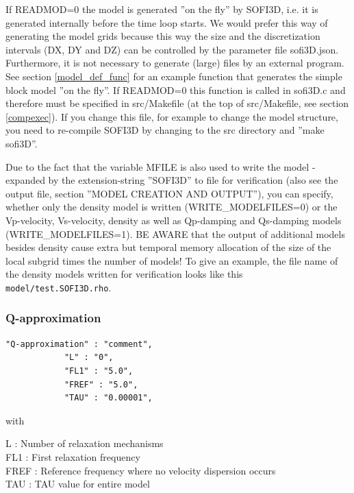 \documentclass[11pt,onecolumn,oneside]{article}
\begin{document}
If READMOD=0 the model is generated ''on the fly'' by SOFI3D, i.e. it is generated internally before the time loop starts. We would prefer this way of generating the model grids because this way the size and the discretization intervals (DX, DY and DZ) can be controlled by the parameter file sofi3D.json. Furthermore, it is not necessary to generate (large) files by an external program. See section \ref{model_def_func} for an example function that generates the simple block model ''on the fly''. If READMOD=0 this function is called in sofi3D.c and therefore must be specified in src/Makefile (at the top of src/Makefile, see section \ref{compexec}). If you change this file, for example to change the model structure, you need to re-compile SOFI3D by changing to the src directory and ''make sofi3D''.

Due to the fact that the variable MFILE is also used to write the model - expanded by the extension-string ''SOFI3D'' to file for verification (also see the output file, section ''MODEL CREATION AND OUTPUT''), you can specify, whether only the density model is written (WRITE\_MODELFILES=0) or the Vp-velocity, Vs-velocity, density as well as Qp-damping and Qs-damping models (WRITE\_MODELFILES=1). BE AWARE that the output of additional models besides density cause extra but temporal memory allocation of the size of the local subgrid times the number of models! To give an example, the file name of the density models written for verification looks like this  \lstinline{model/test.SOFI3D.rho}.

\subsubsection{Q-approximation}
\begin{verbatim}
"Q-approximation" : "comment",
            "L" : "0",
            "FL1" : "5.0", 
            "FREF" : "5.0",
            "TAU" : "0.00001",
\end{verbatim}

with

L : Number of relaxation mechanisms\\
FL1 : First relaxation frequency \\
FREF : Reference frequency where no velocity dispersion occurs \\
TAU : TAU value for entire model\\
\end{document}
